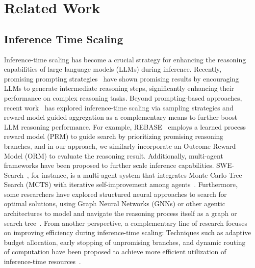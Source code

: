 \documentclass{article} %
\theoremstyle{definition}
\theoremstyle{remark}
\begin{document}
\section{Related Work}
\subsection{Inference Time Scaling}

Inference-time scaling has become a crucial strategy for enhancing the reasoning capabilities of large language models (LLMs) during inference. Recently, promising prompting strategies~\citep{wei2022chain, yao2023tree} have shown promising results by encouraging LLMs to generate intermediate reasoning steps, significantly enhancing their performance on complex reasoning tasks. Beyond prompting-based approaches, recent work~\citep{lightman2024lets, brown2024largelanguagemonkeysscaling, snell2025scaling, wu2025inference, light2025disc, liu-etal-2025-rethinking} has explored inference-time scaling via sampling strategies and reward model guided aggregation as a complementary means to further boost LLM reasoning performance. For example, REBASE~\citep{wu2025inference} employs a learned process reward model (PRM) to guide search by prioritizing promising reasoning branches, and in our approach, we similarly incorporate an Outcome Reward Model (ORM) to evaluate the reasoning result. Additionally, multi-agent frameworks have been proposed to further scale inference capabilities. SWE-Search~\citep{antoniades2025swesearch}, for instance, is a multi-agent system that integrates Monte Carlo Tree Search (MCTS) with iterative self-improvement among agents~\citep{zhang2025aflow, jin2025two, light2025strategist}. Furthermore, some researchers have explored structured neural approaches to search for optimal solutions, using Graph Neural Networks (GNNs) or other agentic architectures to model and navigate the reasoning process itself as a graph or search tree~\citep{zhangg, zhang2025aflow, zhangcut}. From another perspective, a complementary line of research focuses on improving efficiency during inference-time scaling: Techniques such as adaptive budget allocation, early stopping of unpromising branches, and dynamic routing of computation have been proposed to achieve more efficient utilization of inference-time resources~\citep{misaki2025wider, xu-etal-2025-ph, li2024escape, light2025sfs}.
\end{document}
